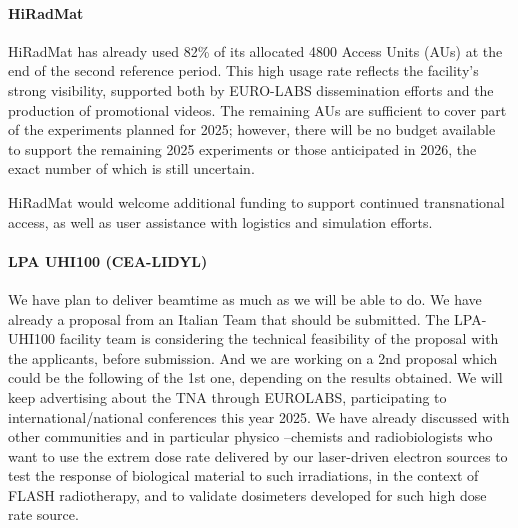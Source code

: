 {%
    

\paragraph{HiRadMat} HiRadMat has already used 82\% of its allocated 4800 Access Units (AUs) at the end of the second reference period. This high usage rate reflects the facility’s strong visibility, supported both by EURO-LABS dissemination efforts and the production of promotional videos. The remaining AUs are sufficient to cover part of the experiments planned for 2025; however, there will be no budget available to support the remaining 2025 experiments or those anticipated in 2026, the exact number of which is still uncertain.

HiRadMat would welcome additional funding to support continued transnational access, as well as user assistance with logistics and simulation efforts.

\paragraph{LPA UHI100 (CEA-LIDYL)} We have plan to deliver beamtime as much as we will be able to do. We have already a proposal from an Italian Team that should be submitted. The LPA-UHI100 facility team is considering the technical feasibility of the proposal with the applicants, before submission. And we are working on a 2nd proposal which could be the following of the 1st one, depending on the results obtained. We will keep advertising about the TNA through EUROLABS, participating to international/national conferences this year 2025.  We have already discussed with other communities and in particular physico –chemists and radiobiologists who want to use the extrem dose rate delivered by our laser-driven electron sources to test the response of biological material to such irradiations, in the context of FLASH radiotherapy, and to validate dosimeters developed for such high dose rate source.  

}

